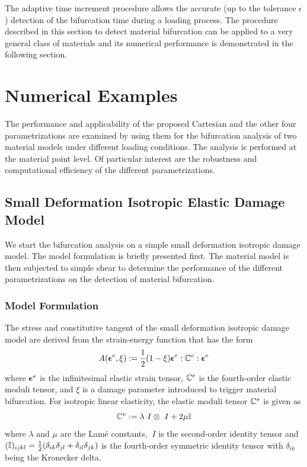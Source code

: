 \documentclass[12pt]{article}
\numberwithin{equation}{section}
\begin{document}
The adaptive time increment procedure allows the accurate (up to the
tolerance $\epsilon$) detection of the bifurcation time during a
loading process. The procedure described in this section to detect
material bifurcation can be applied to a very general class of
materials and its numerical performance is demonstrated in the
following section.

\section{Numerical Examples}
\label{sec:numerical-examples}

The performance and applicability of the proposed Cartesian and the
other four parametrizations are examined by using them for the
bifurcation analysis of two material models under different loading
conditions. The analysis is performed at the material point level. Of
particular interest are the robustness and computational efficiency of
the different parametrizations.

\subsection{Small Deformation Isotropic Elastic Damage Model}
\label{subsec:isotropic}

We start the bifurcation analysis on a simple small deformation
isotropic damage model. The model formulation is briefly presented
first. The material model is then subjected to simple shear to
determine the performance of the different parametrizations on the
detection of material bifurcation.

\subsubsection{Model Formulation}

The stress and constitutive tangent of the small deformation isotropic
damage model are derived from the strain-energy function that has the
form
\begin{equation}\label{eq:iso-psi}
  A({\boldsymbol{\epsilon}} ^e, \xi)
  :=
  \frac{1}{2} (1 - \xi)
  {\boldsymbol{\epsilon}} ^e : \mathbb{C}^e : {\boldsymbol{\epsilon}} ^e
\end{equation}
where ${\boldsymbol{\epsilon}}^e$ is the infinitesimal elastic strain tensor,
$\mathbb{C}^e$ is the fourth-order elastic moduli tensor, and $\xi$ is a
damage parameter introduced to trigger material bifurcation. For
isotropic linear elasticity, the elastic moduli tensor $\mathbb{C}^e$ is
given as
\begin{equation}
  \mathbb{C}^e := \lambda ~I \otimes ~I + 2\mu \mathbb{I}
\end{equation}
where $\lambda$ and $\mu$ are the Lam\'{e} constants, $~I$ is the
second-order identity tensor and $(\mathbb{I})_{ijkl} =
\frac{1}{2}(\delta_{ik}\delta_{jl} + \delta_{il}\delta_{jk})$ is the
fourth-order symmetric identity tensor with $\delta_{ik}$ being the
Kronecker delta.
\end{document}
